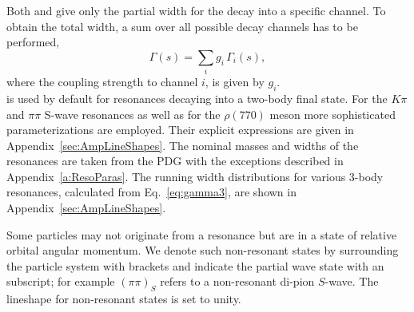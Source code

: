 Both  and  give only the partial width for the decay into a specific channel.
To obtain the total width, a sum over all possible decay channels has to be performed,
\begin{equation}
	\Gamma(s) = \sum_{i} g_{i} \, \Gamma_{i}(s) ,
\end{equation}
where the coupling strength to channel $i$, is given by $g_{i}$.
\newline
\\
\noindent 
{} is used by default for resonances decaying into a two-body final state.
For the $K\pi$ and $\pi\pi$ S-wave resonances as well as for the $\rho(770)$ meson more sophisticated parameterizations are employed.
Their explicit expressions are given  in Appendix~\ref{sec:AmpLineShapes}. 
The nominal masses and widths of the resonances are taken from the PDG \cite{PDG2016} with the exceptions described in Appendix~\ref{a:ResoParas}.
The running width distributions for various 3-body resonances, calculated from Eq.~\ref{eq:gamma3}, are shown in Appendix~\ref{sec:AmpLineShapes}.

Some particles may not originate from a resonance but are in a state of relative orbital angular momentum.
We denote such non-resonant states by surrounding the particle system with brackets  and indicate the partial wave state with an subscript;
for example $(\pi \pi)_S$ refers to a non-resonant di-pion $S$-wave.
The lineshape for non-resonant states is set to unity.


